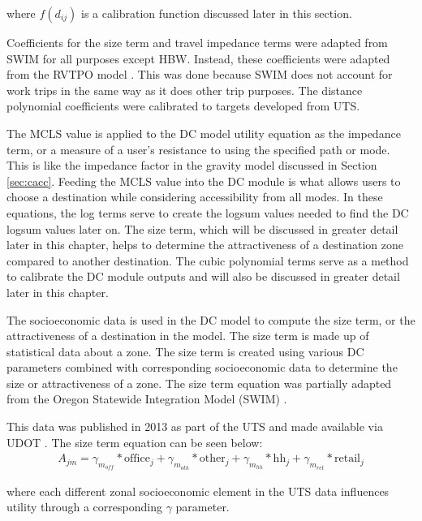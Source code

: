 \noindent where $f(d_{ij})$ is a calibration function discussed later in this section.

Coefficients for the
size term and travel impedance terms were adapted from SWIM \citet{swimversion}
for all purposes except HBW. Instead, these coefficients were
adapted from the RVTPO model \citet{rvtpoversion}. This was done because SWIM
does not account for work trips in the same way as it does other trip purposes.
The distance polynomial coefficients were
calibrated to targets developed from UTS.

The MCLS value is applied to the DC model utility equation as the impedance
term, or a measure of
a user’s resistance to using the specified path or mode. This is like the
impedance factor in the
gravity model discussed in Section \ref{sec:cacc}. Feeding the MCLS value into
the DC module is what allows
users to choose a destination while considering accessibility from all modes. In these
equations, the log terms serve to create the logsum values needed to find
the DC logsum values later on.
The size term, which
will be discussed in greater detail later in this chapter, helps to determine
the attractiveness
of a destination zone compared to another destination. The cubic polynomial
terms serve as a
method to calibrate the DC module outputs and will also be discussed in
greater detail later in
this chapter.

The socioeconomic data is used in the DC model to compute the size term, or
the attractiveness of
a destination in the model. The size term is made up of statistical
data about a zone. The size term is
created using various DC parameters combined with corresponding socioeconomic data
to determine the size or attractiveness of a zone. The size term equation was partially
adapted from the Oregon Statewide Integration Model (SWIM) \citep{swimversion}.

This data was published in 2013 as part of the UTS and made available via
UDOT \citep{uts2013}.  The size term
equation can be seen below:
\begin{equation}
\begin{aligned}
	A_{jm} = \gamma_{m_{off}} * \mathrm{office}_j + \gamma_{m_{oth}} * \mathrm{other}_j + \gamma_{m_{hh}} * \mathrm{hh}_j + \gamma_{m_{ret}} * \mathrm{retail}_j
	\label{eqn:sizeterm}
\end{aligned}
\end{equation}

\noindent where each different zonal socioeconomic element in the UTS data influences
utility through a corresponding $\gamma$ parameter.

